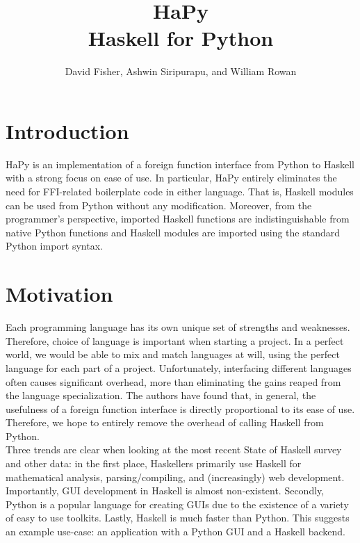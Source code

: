 \documentclass[11pt, letterpaper, oneside, twocolumn] {article}
\begin{document}
\title{HaPy \\
Haskell for Python
}
\author{David Fisher, Ashwin Siripurapu, and William Rowan}
\maketitle

\section{Introduction}
HaPy is an implementation of a foreign function interface from Python to Haskell with a strong focus on ease of use. In particular, HaPy entirely eliminates the need for FFI-related boilerplate code in either language.  That is, Haskell modules can be used from Python without any modification. Moreover, from the programmer's perspective, imported Haskell functions are indistinguishable from native Python functions and Haskell modules are imported using the standard Python import syntax.

\section{Motivation}
Each programming language has its own unique set of strengths and weaknesses.  Therefore, choice of language is important when starting a project.  In a perfect world, we would be able to mix and match languages at will, using the perfect language for each part of a project.  Unfortunately, interfacing different languages often causes significant overhead, more than eliminating the gains reaped from the language specialization.  The authors have found that, in general, the usefulness of a foreign function interface is directly proportional to its ease of use.  Therefore, we hope to entirely remove the overhead of calling Haskell from Python. \\
Three trends are clear when looking at the most recent State of Haskell survey\cite{state_of_haskell} and other data: in the first place, Haskellers primarily use Haskell for mathematical analysis, parsing/compiling, and (increasingly) web development. Importantly, GUI development in Haskell is almost non-existent. Secondly, Python is a popular language for creating GUIs due to the existence of a variety of easy to use toolkits. Lastly, Haskell is much faster than Python.  This suggests an example use-case: an application with a Python GUI and a Haskell backend.
\end{document}
